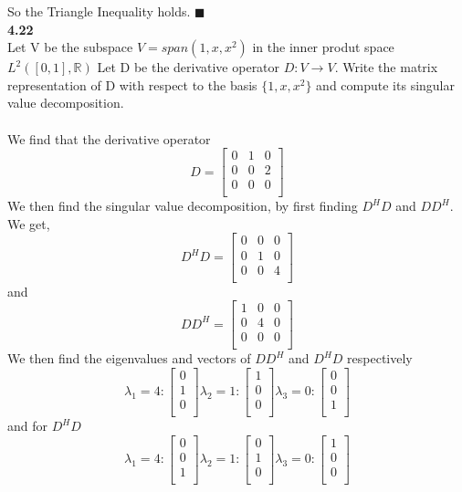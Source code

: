 \documentclass[letterpaper,12pt]{article}
\theoremstyle{definition}
\begin{document}
So the Triangle Inequality holds. \hfill $\blacksquare$\\

\textbf{4.22}\\
\indent Let V be the subspace $V=span(1,x,x^2)$ in the inner produt space $L^2([0,1], \mathbb{R})$ Let D be the derivative operator $D:V\rightarrow V$. Write the matrix representation of D with respect to the basis $\{1,x,x^2\}$ and compute its singular value decomposition.\\
\\
We find that the derivative operator
\[D=
\begin{bmatrix}
   0 &  1 & 0 \\
   0 &  0 & 2\\
   0 & 0 & 0\\
  \end{bmatrix}\]
We then find the singular value decomposition, by first finding $D^HD$ and $DD^H$. We get,
\[D^HD=\begin{bmatrix}
   0 &  0 & 0 \\
   0 &  1 & 0\\
   0 & 0 & 4\\
  \end{bmatrix}\]
  and
  \[DD^H=\begin{bmatrix}
   1 &  0 & 0 \\
   0 &  4 & 0\\
   0 & 0 & 0\\
  \end{bmatrix}\]
  We then find the eigenvalues and vectors of $DD^H$ and $D^HD$ respectively
\[\lambda_1=4:
\begin{bmatrix}
   0 \\
   1\\
   0 \\
  \end{bmatrix}
  \lambda_2=1:
\begin{bmatrix}
   1 \\
   0\\
   0 \\
  \end{bmatrix}
  \lambda_3=0:
\begin{bmatrix}
   0 \\
   0\\
   1 \\
  \end{bmatrix}\]
  and for $D^HD$
  \[\lambda_1=4:
\begin{bmatrix}
   0 \\
   0\\
   1 \\
  \end{bmatrix}
  \lambda_2=1:
\begin{bmatrix}
   0 \\
   1\\
   0 \\
  \end{bmatrix}
  \lambda_3=0:
\begin{bmatrix}
   1 \\
   0\\
   0 \\
  \end{bmatrix}\]
\end{document}
